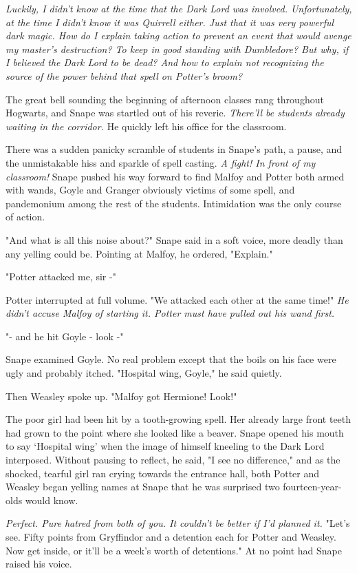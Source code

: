 \emph{Luckily, I didn't know at the time that the Dark Lord was involved. Unfortunately, at the time I didn't know it was Quirrell either. Just that it was very powerful dark magic. How do I explain taking action to prevent an event that would avenge my master's destruction? To keep in good standing with Dumbledore? But why, if I believed the Dark Lord to be dead? And how to explain not recognizing the source of the power behind that spell on Potter's broom?}

The great bell sounding the beginning of afternoon classes rang throughout Hogwarts, and Snape was startled out of his reverie. \emph{There'll be students already waiting in the corridor.} He quickly left his office for the classroom.

There was a sudden panicky scramble of students in Snape's path, a pause, and the unmistakable hiss and sparkle of spell casting. \emph{A fight! In front of my classroom!} Snape pushed his way forward to find Malfoy and Potter both armed with wands, Goyle and Granger obviously victims of some spell, and pandemonium among the rest of the students. Intimidation was the only course of action.

"And what is all this noise about?" Snape said in a soft voice, more deadly than any yelling could be. Pointing at Malfoy, he ordered, "Explain."

"Potter attacked me, sir -"

Potter interrupted at full volume. "We attacked each other at the same time!" \emph{He didn't accuse Malfoy of starting it. Potter must have pulled out his wand first.}

"- and he hit Goyle - look -"

Snape examined Goyle. No real problem except that the boils on his face were ugly and probably itched. "Hospital wing, Goyle," he said quietly.

Then Weasley spoke up. "Malfoy got Hermione! Look!"

The poor girl had been hit by a tooth-growing spell. Her already large front teeth had grown to the point where she looked like a beaver. Snape opened his mouth to say `Hospital wing' when the image of himself kneeling to the Dark Lord interposed. Without pausing to reflect, he said, "I see no difference," and as the shocked, tearful girl ran crying towards the entrance hall, both Potter and Weasley began yelling names at Snape that he was surprised two fourteen-year-olds would know.

\emph{Perfect. Pure hatred from both of you. It couldn't be better if I'd planned it.} "Let's see. Fifty points from Gryffindor and a detention each for Potter and Weasley. Now get inside, or it'll be a week's worth of detentions." At no point had Snape raised his voice.

